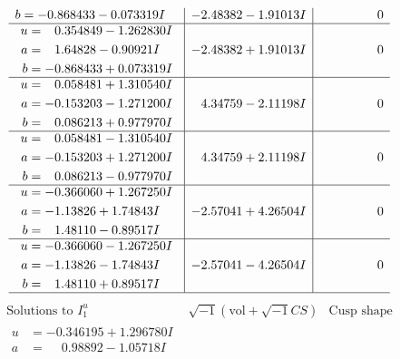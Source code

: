 \documentclass[1p]{elsarticle_modified}
\theoremstyle{definition}
\newcommand{\I}{\sqrt{-1}}
\begin{document}
$$\begin{array}{c|c|c}
\begin{aligned}
b &= -0.868433 - 0.073319 I\end{aligned}
 & -2.48382 - 1.91013 I & \phantom{-0.000000 } 0 \\ \hline\begin{aligned}
u &= \phantom{-}0.354849 - 1.262830 I \\
a &= \phantom{-}1.64828 - 0.90921 I \\
b &= -0.868433 + 0.073319 I\end{aligned}
 & -2.48382 + 1.91013 I & \phantom{-0.000000 } 0 \\ \hline\begin{aligned}
u &= \phantom{-}0.058481 + 1.310540 I \\
a &= -0.153203 - 1.271200 I \\
b &= \phantom{-}0.086213 + 0.977970 I\end{aligned}
 & \phantom{-}4.34759 - 2.11198 I & \phantom{-0.000000 } 0 \\ \hline\begin{aligned}
u &= \phantom{-}0.058481 - 1.310540 I \\
a &= -0.153203 + 1.271200 I \\
b &= \phantom{-}0.086213 - 0.977970 I\end{aligned}
 & \phantom{-}4.34759 + 2.11198 I & \phantom{-0.000000 } 0 \\ \hline\begin{aligned}
u &= -0.366060 + 1.267250 I \\
a &= -1.13826 + 1.74843 I \\
b &= \phantom{-}1.48110 - 0.89517 I\end{aligned}
 & -2.57041 + 4.26504 I & \phantom{-0.000000 } 0 \\ \hline\begin{aligned}
u &= -0.366060 - 1.267250 I \\
a &= -1.13826 - 1.74843 I \\
b &= \phantom{-}1.48110 + 0.89517 I\end{aligned}
 & -2.57041 - 4.26504 I & \phantom{-0.000000 } 0\\
 \hline 
 \end{array}$$\newpage$$\begin{array}{c|c|c}  
\text{Solutions to }I^u_{1}& \I (\text{vol} + \sqrt{-1}CS) & \text{Cusp shape}\\
 \hline 
\begin{aligned}
u &= -0.346195 + 1.296780 I \\
a &= \phantom{-}0.98892 - 1.05718 I \\

\end{aligned}
\end{array}$$
\end{document}
